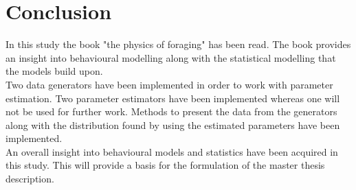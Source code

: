 \chapter{Conclusion}
In this study the book "the physics of foraging"\cite{viswanathan2011the} has been read. The book provides an insight into behavioural modelling along with the statistical modelling that the models build upon.\\
Two data generators have been implemented in order to work with parameter estimation. Two parameter estimators have been implemented whereas one will not be used for further work. Methods to present the data from the generators along with the distribution found by using the estimated parameters have been implemented.\\
An overall insight into behavioural models and statistics have been acquired in this study. This will provide a basis for the formulation of the master thesis description.\\